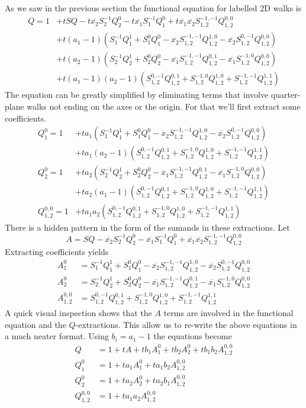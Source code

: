 \documentclass[12pt]{article}
\theoremstyle{definition} \newtheorem{definition}[theorem]{Definition}
\newcommand{\ol}[1]{\overline{#1}}
\newcommand{\Q}[2]{Q_{#1}^{#2}}
\newcommand{\Qf}[1]{Q_{1,2}^{#1}}
\newcommand{\es}[2]{S_{#1}^{#2}}
\newcommand{\Sf}[1]{S_{1,2}^{#1}}
\newcommand{\aye}[2]{A_{#1}^{#2}}
\begin{document}
As we saw in the previous section the functional equation for labelled 2D walks is
\begin{align*}
Q = 1 &+ tSQ - t \ol{x_2}\es{2}{-1}\Q{2}{0} - t\ol{x_1}\es{1}{-1}\Q{1}{0}+t\ol{x_1}\ol{x_2}\Sf{-1,-1}\Qf{0,0}\\
	&+ t(a_1-1)(\es{1}{-1}\Q{1}{1}+\es{1}{0}\Q{1}{0}-\ol{x_2}\Sf{-1,-1}\Qf{1,0}-\ol{x_2}\Sf{0,-1}\Qf{0,0})\\
	&+ t(a_2-1)(\es{2}{-1}\Q{2}{1}+\es{2}{0}\Q{2}{0}-\ol{x_1}\Sf{-1,-1}\Qf{0,1}-\ol{x_1}\Sf{-1,0}\Qf{0,0})\\
	&+t(a_1-1)(a_2-1)(\Sf{0,-1}\Qf{0,1}+\Sf{-1,0}\Qf{1,0}+\Sf{-1,-1}\Qf{1,1})
\end{align*}
The equation can be greatly simplified by eliminating terms that involve quarter-plane walks not ending on the axes or the origin. For that we'll first extract some coefficients.
\begin{align*}
Q_1^0 = 1 &+  t a_1 (S_1^{-1}Q_1^1+S_1^0 Q_1^0-\ol x_2 \Sf{-1,-1}\Qf{1,0}-\ol{x_2}\Sf{0,-1}\Qf{0,0})\\
                   &+ta_1 (a_2-1)(\Sf{0,-1}\Qf{0,1}+\Sf{-1,0}\Qf{1,0}+\Sf{-1,-1}\Qf{1,1})\\
Q_2^0 = 1 &+  t a_2 (S_2^{-1}Q_2^1+S_2^0 Q_2^0-\ol x_1 \Sf{-1,-1}\Qf{0,1}-\ol{x_1}\Sf{-1,0}\Qf{0,0})\\
                   &+ta_2 (a_1-1)(\Sf{0,-1}\Qf{0,1}+\Sf{-1,0}\Qf{1,0}+\Sf{-1,-1}\Qf{1,1})\\
\Qf{0,0} = 1 &+  t a_1 a_2 (\Sf{0,-1}\Qf{0,1}+\Sf{-1,0}\Qf{1,0}+\Sf{-1,-1}\Qf{1,1})
\end{align*}
There is a hidden pattern in the form of the sumands in these extractions. Let
\[
      A = SQ -  \ol{x_2}\es{2}{-1}\Q{2}{0} -\ol{x_1}\es{1}{-1}\Q{1}{0}+\ol{x_1}\ol{x_2}\Sf{-1,-1}\Qf{0,0}
\]
Extracting coefficients yields
\begin{align*}
A_1^0 &= \es{1}{-1}\Q{1}{1}+\es{1}{0}\Q{1}{0}-\ol{x_2}\Sf{-1,-1}\Qf{1,0}-\ol{x_2}\Sf{0,-1}\Qf{0,0}\\
A_2^0 &= \es{2}{-1}\Q{2}{1}+\es{2}{0}\Q{2}{0}-\ol{x_1}\Sf{-1,-1}\Qf{0,1}-\ol{x_1}\Sf{-1,0}\Qf{0,0}\\
\aye{1,2}{0,0} &= \Sf{0,-1}\Qf{0,1}+\Sf{-1,0}\Qf{1,0}+\Sf{-1,-1}\Qf{1,1}
\end{align*}
A quick visual inspection shows that the $A$ terms are involved in the functional equation and the $Q$-extractions. This allow us to re-write the above equations in a much neater format. Using $b_i = a_1 - 1$ the equations become
\begin{align*}
Q &= 1+ tA + tb_1A_1^0+tb_2 A_2^0 + tb_1b_2 \aye{1,2}{0,0}\\
Q_1^0 & = 1+t a_1 A_1^0 + ta_1b_2 \aye{1,2}{0,0}\\
Q_2^0 & = 1+t a_2 A_2^0 + ta_2b_1 \aye{1,2}{0,0}\\
\Qf{0,0} &= 1+ t a_1a_2 \aye{1,2}{0,0}
\end{align*}
\end{document}

